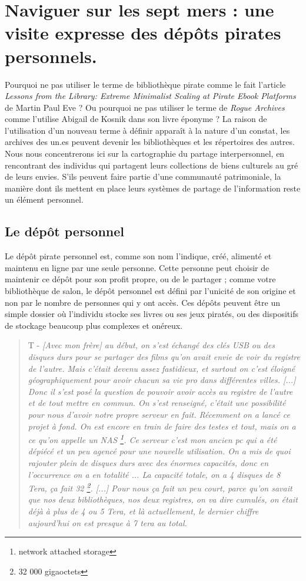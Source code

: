 \section{Naviguer sur les sept mers : une visite expresse des dépôts pirates personnels.}

Pourquoi ne pas utiliser le terme de bibliothèque pirate comme le fait l'article \textit{Lessons from the Library: Extreme Minimalist Scaling at Pirate Ebook Platforms} de Martin Paul Eve ? Ou pourquoi ne pas utiliser le terme de \textit{Rogue Archives} comme l'utilise Abigail de Kosnik dans son livre éponyme ? La raison de l'utilisation d'un nouveau terme à définir apparaît à la nature d'un constat, les archives des un.es peuvent devenir les bibliothèques et les répertoires des autres. Nous nous concentrerons ici sur la cartographie du partage interpersonnel, en rencontrant des individus qui partagent leurs collections de biens culturels au gré de leurs envies. S'ils peuvent faire partie d'une communauté patrimoniale, la manière dont ils mettent en place leurs systèmes de partage de l'information reste un élément personnel. 

\subsection*{Le dépôt personnel}

Le dépôt pirate personnel est, comme son nom l'indique, créé, alimenté et maintenu en ligne par une seule personne. Cette personne peut choisir de maintenir ce dépôt pour son profit propre, ou de le partager ; comme votre bibliothèque de salon, le dépôt personnel est défini par l'unicité de son origine et non par le nombre de personnes qui y ont accès. Ces dépôts peuvent être un simple dossier où l'individu stocke ses livres ou ses jeux piratés, ou des dispositifs de stockage beaucoup plus complexes et onéreux.

\begin{quote}
    T - \textit{[Avec mon frère] au début, on s'est échangé des clés USB ou des disques durs pour se partager des films qu'on avait envie de voir du registre de l'autre. Mais c'était devenu assez fastidieux, et surtout on c'est éloigné géographiquement pour avoir chacun sa vie pro dans différentes villes. [...] Donc il s'est posé la question de pouvoir avoir accès au registre de l'autre et de tout mettre en commun. On s'est renseigné, c'était une possibilité pour nous d'avoir notre propre serveur en fait. Récemment on a lancé ce projet à fond. On est encore en train de faire des testes et tout, mais on a ce qu'on appelle un NAS \footnote{network attached storage}. Ce serveur c'est mon ancien pc qui a été dépiécé et un peu agencé pour une nouvelle utilisation. On a mis de quoi rajouter plein de disques durs avec des énormes capacités, donc en l’occurrence on a en totalité ... La capacité totale, on a 4 disques de 8 Tera, ça fait 32 \footnote{32 000 gigaoctets}. [...] Pour nous ça fait un peu court, parce qu'on savait que nos deux bibliothèques, nos deux registres, on va dire cumulés, on était déjà à plus de 4 ou 5 Tera, et là actuellement, le dernier chiffre aujourd'hui on est presque à 7 tera au total.}
\end{quote}

